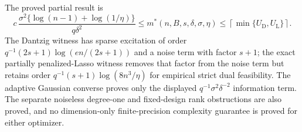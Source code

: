 The proved partial result is
\[
 c\,\frac{\sigma^2\{\log(n-1)+\log(1/\eta)\}}{q\delta^2}
 \le m^*(n,B,s,\delta,\sigma,\eta)
 \le\left\lceil\min\{U_{\mathrm D},U_{\mathrm L}\}\right\rceil.
\]
The Dantzig witness has sparse excitation of order \(q^{-1}(2s+1)\log(en/(2s+1))\) and a noise term with factor \(s+1\); the exact partially penalized-Lasso witness removes that factor from the noise term but retains order \(q^{-1}(s+1)\log(8n^3/\eta)\) for empirical strict dual feasibility.  The adaptive Gaussian converse proves only the displayed \(q^{-1}\sigma^2\delta^{-2}\) information term.  The separate noiseless degree-one and fixed-design rank obstructions are also proved, and no dimension-only finite-precision complexity guarantee is proved for either optimizer.